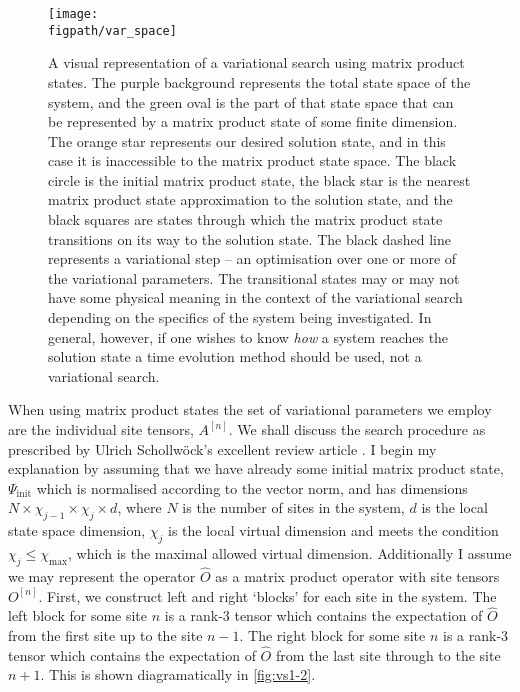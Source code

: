 \begin{figure}[ht!]
\centering
\texttt{[image: \\figpath/var\_space]}
\caption{A visual representation of a variational search using matrix product states. The purple background represents the total state space of the system, and the green oval is the part of that state space that can be represented by a matrix product state of some finite dimension. The orange star represents our desired solution state, and in this case it is inaccessible to the matrix product state space. The black circle is the initial matrix product state, the black star is the nearest matrix product state approximation to the solution state, and the black squares are states through which the matrix product state transitions on its way to the solution state. The black dashed line represents a variational step -- an optimisation over one or more of the variational parameters. The transitional states may or may not have some physical meaning in the context of the variational search depending on the specifics of the system being investigated. In general, however, if one wishes to know \emph{how} a system reaches the solution state a time evolution method should be used, not a variational search.}
\label{fig:vs1-1}
\end{figure}

When using matrix product states the set of variational parameters we employ are the individual site tensors, \(A^{[n]}\). We shall discuss the search procedure as prescribed by Ulrich Schollw\"{o}ck's excellent review article \cite{Schollwock2011}. I begin my explanation by assuming that we have already some initial matrix product state, \(\Psi_{\mathrm{init}}\) which is normalised according to the vector norm, and has dimensions \(N \times \chi_{j-1} \times \chi_{j} \times d\), where \(N\) is the number of sites in the system, \(d\) is the local state space dimension, \(\chi_{j}\) is the local virtual dimension and meets the condition \(\chi_{j} \leq \chi_{\mathrm{max}}\), which is the maximal allowed virtual dimension. Additionally I assume we may represent the operator \(\hat{O}\) as a matrix product operator with site tensors \(O^{[n]}\). First, we construct left and right `blocks' for each site in the system. The left block for some site \(n\) is a rank-3 tensor which contains the expectation of \(\hat{O}\) from the first site up to the site \(n-1\). The right block for some site \(n\) is a rank-3 tensor which contains the expectation of \(\hat{O}\) from the last site through to the site \(n+1\). This is shown diagramatically in \cref{fig:vs1-2}.

